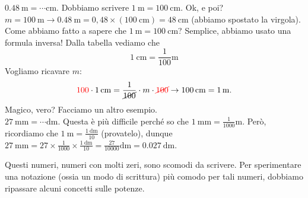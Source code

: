 \documentclass[12pt,a4paper,oneside]{book}
\newcounter{testexample} %
\theoremstyle{esercizio}
\begin{document}
\begin{testexample}
$\SI{0,48}{\meter} = \cdots \si{\centi\meter}$. Dobbiamo scrivere $\SI{1}{\meter} = \SI{100}{\centi\meter}$. Ok, e poi? $m=\SI{100}{\meter} \rightarrow \SI{0,48}{\meter} = 0,48\times\left(\SI{100}{\centi\meter}\right) = \SI{48}{\centi\meter}$ (abbiamo spostato la virgola). Come abbiamo fatto a sapere che  $\SI{1}{\meter} = \SI{100}{\centi\meter}$? Semplice, abbiamo usato una formula inversa! Dalla tabella vediamo che 
\[
\SI{1}{\centi\meter} = \frac{1}{100}\si{\meter}
\]
Vogliamo ricavare $m$:
\[
\textcolor{red}{100}\cdot \SI{1}{\centi\meter} = \frac{1}{\cancel{100}}\cdot m \cdot \textcolor{red}{\cancel{100}} \rightarrow \SI{100}{\centi\meter}  = \SI{1}{\meter}.
\]
Magico, vero? Facciamo un altro esempio.\\

$\SI{27}{\milli\meter} = \cdots \si{\deca\meter}$. Questa è più difficile perché so che $ \SI{1}{\milli\meter}  = \frac{1}{1000} \si{\meter}$. Però, ricordiamo che $ \SI{1}{\meter}  = \frac
{\SI{1}{\deca\meter}}{10}$ (provatelo), dunque $ \SI{27}{\milli\meter}  = 27\times \frac
{1}{1000}\times\frac{\SI{1}{\deca\meter}}{10} =\frac{27}{10000}\si{\deca\meter} =\SI{0,027}{\deca\meter}$. 

Questi numeri, numeri con molti zeri, sono scomodi da scrivere. Per sperimentare una notazione (ossia un modo di scrittura) più comodo per tali numeri, dobbiamo ripassare alcuni concetti sulle potenze.
\end{testexample}
\end{document}
